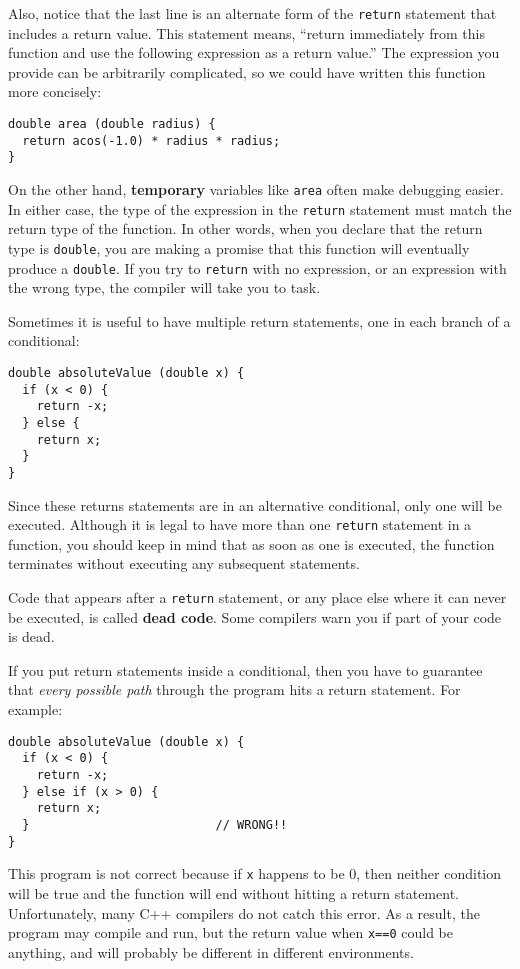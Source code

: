 Also, notice that the last line is an alternate form of the
{\tt return} statement that includes a return value.  This
statement means, ``return immediately from this function and
use the following expression as a return value.''  The
expression you provide can be arbitrarily complicated,
so we could have written this function more concisely:

\begin{verbatim}
double area (double radius) {
  return acos(-1.0) * radius * radius;
}
\end{verbatim}
%
On the other hand, {\bf temporary} variables like {\tt area} often
make debugging easier.  In either case, the type of the expression in
the {\tt return} statement must match the return type of the function.
In other words, when you declare that the return type is {\tt double},
you are making a promise that this function will eventually
produce a {\tt double}.  If you try to {\tt return} with no
expression, or an expression with the wrong type, the compiler will
take you to task.


Sometimes it is useful to have multiple return
statements, one in each branch of a conditional:

\begin{verbatim}
double absoluteValue (double x) {
  if (x < 0) {
    return -x;
  } else {
    return x;
  }
}
\end{verbatim}
%
Since these returns statements are in an alternative conditional, only
one will be executed.  Although it is legal to have more than one
{\tt return} statement in a function, you should keep in mind that as soon
as one is executed, the function terminates without executing any
subsequent statements.

Code that appears after a {\tt return} statement, or any place else
where it can never be executed, is called {\bf dead code}.  Some
compilers warn you if part of your code is dead.


If you put return statements inside a conditional, then
you have to guarantee that {\em every possible path} through
the program hits a return statement.  For example:

\begin{verbatim}
double absoluteValue (double x) {
  if (x < 0) {
    return -x;
  } else if (x > 0) {
    return x;
  }                          // WRONG!!
}
\end{verbatim}
%
This program is not correct because if {\tt x} happens to be 0, then
neither condition will be true and the function will end without hitting
a return statement.  Unfortunately, many C++ compilers do not catch
this error.  As a result, the program may compile and run, but the
return value when {\tt x==0} could be anything, and will probably
be different in different environments.

